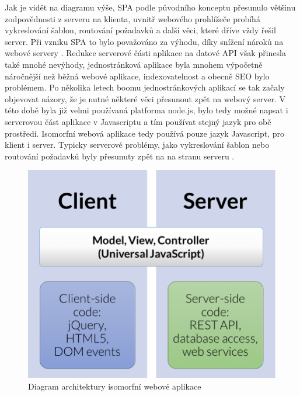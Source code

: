 Jak je vidět na diagramu výše, SPA podle původního konceptu přesunulo většinu zodpovědnosti z serveru na klienta, uvnitř webového prohlížeče probíhá vykreslování šablon, routování požadavků a další věci, které dříve vždy řešil server. Při vzniku SPA to bylo považováno za výhodu, díky snížení nároků na webové servery \cite{spa_book}. Redukce serverové části aplikace na datové API však přinesla také mnohé nevýhody, jednostránková aplikace byla mnohem výpočetně náročnější než běžná webové aplikace, indexovatelnost a obecně SEO bylo problémem. Po několika letech boomu jednostránkových aplikací se tak začaly objevovat názory, že je nutné některé věci přesunout zpět na webový server. V této době byla již velmi používaná platforma node.js, bylo tedy možné napsat i serverovou část aplikace v Javascriptu a tím používat stejný jazyk pro obě prostředí. Isomorfní webová aplikace tedy používá pouze jazyk Javascript, pro klient i server. Typicky serverové problémy, jako vykreslování šablon nebo routování požadavků byly přesunuty zpět na na stranu serveru \cite{isomorhic_book}.
\begin{figure}[h]
\begin{centering}
\includegraphics[scale=0.5]{obrazky/isomophic_webpage_architecture}
\par\end{centering}
\caption{Diagram architektury isomorfní webové aplikace \cite{codepicnic_universaljs} \label{fig:isomophic-web-arch-diagram}}
\end{figure}
\FloatBarrier

